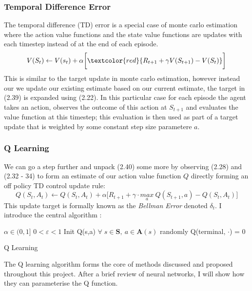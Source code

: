 \subsubsection{Temporal Difference Error}
The temporal difference (TD) error is a special case of monte carlo estimation where the action
value functions and the state value functions are updates with each timestep instead of at the end of each episode.
\begin{equation}
    V(S_t) \leftarrow V(s_t) + \alpha \biggl[\textcolor{red}{R_{t+1} + \gamma V(S_{t+1}) - V(S_t)} \biggl]
\end{equation}
This is similar to the target update in monte carlo estimation, however instead our we update
our existing estimate based on our current estimate, the target in (2.39) is expanded using (2.22).
In this particular case for each episode the agent takes an action, observes the outcome of this action at $S_{t+1}$
and evaluates the value function at this timestep; this evaluation is then used as part of a target update
that is weighted by some constant step size parametere $a$.
\subsubsection{Q Learning}
We can go a step further and unpack (2.40) some more by observing (2.28) and (2.32 - 34) to
form an estimate of our action value function $Q$ directly forming an off policy TD control update rule:
\begin{equation}
    Q(S_t,A_t) \leftarrow Q(S_t,A_t) + \alpha \biggl [R_{t+1} + \gamma \cdot \underset{a}{max} \: Q(S_{t+1}, a) - Q(S_t,A_t) \biggl ]
\end{equation}
This update target is formally known as the \emph{Bellman Error} denoted $\delta_t$. I introduce 
the central algorithm \cite{sutton2018reinforcement}:
\begin{algorithm}[!htb]
    \SetAlgoLined
     $\alpha \in (0,1]$\;
     $0 < \varepsilon < 1$\;
     Init Q(s,a) $\forall \; s \in \mathbf{S}, \: a \in \mathbf{A}(s)$ randomly\;
     Q(terminal, $\cdot$) = 0\;
     \caption{Q Learning }
\end{algorithm}
The Q learning algorithm forms the core of methods discussed and proposed throughout this project.
After a brief review of neural networks, I will show how they can parameterise the Q function.
